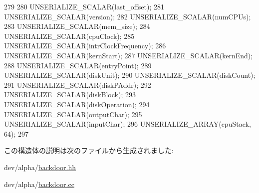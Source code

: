 \begin{DoxyCode}
279 {
280     UNSERIALIZE_SCALAR(last_offset);
281     UNSERIALIZE_SCALAR(version);
282     UNSERIALIZE_SCALAR(numCPUs);
283     UNSERIALIZE_SCALAR(mem_size);
284     UNSERIALIZE_SCALAR(cpuClock);
285     UNSERIALIZE_SCALAR(intrClockFrequency);
286     UNSERIALIZE_SCALAR(kernStart);
287     UNSERIALIZE_SCALAR(kernEnd);
288     UNSERIALIZE_SCALAR(entryPoint);
289     UNSERIALIZE_SCALAR(diskUnit);
290     UNSERIALIZE_SCALAR(diskCount);
291     UNSERIALIZE_SCALAR(diskPAddr);
292     UNSERIALIZE_SCALAR(diskBlock);
293     UNSERIALIZE_SCALAR(diskOperation);
294     UNSERIALIZE_SCALAR(outputChar);
295     UNSERIALIZE_SCALAR(inputChar);
296     UNSERIALIZE_ARRAY(cpuStack, 64);
297 }
\end{DoxyCode}


この構造体の説明は次のファイルから生成されました:\begin{DoxyCompactItemize}
\item 
dev/alpha/\hyperlink{backdoor_8hh}{backdoor.hh}\item 
dev/alpha/\hyperlink{backdoor_8cc}{backdoor.cc}\end{DoxyCompactItemize}
